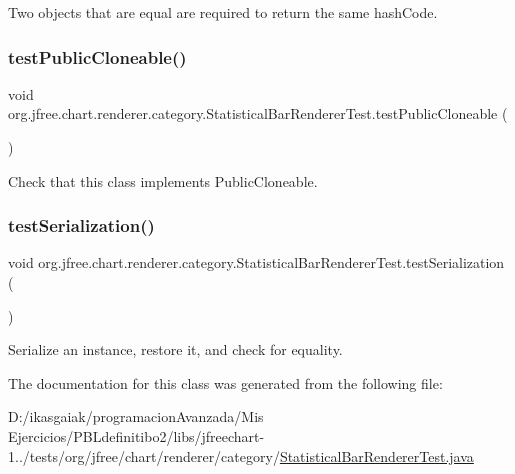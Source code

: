 Two objects that are equal are required to return the same hash\+Code. \mbox{\label{classorg_1_1jfree_1_1chart_1_1renderer_1_1category_1_1_statistical_bar_renderer_test_aa25476595a71144ad7cafc4b03542846}} 
\subsubsection{\texorpdfstring{test\+Public\+Cloneable()}{testPublicCloneable()}}
{\footnotesize\ttfamily void org.\+jfree.\+chart.\+renderer.\+category.\+Statistical\+Bar\+Renderer\+Test.\+test\+Public\+Cloneable (\begin{DoxyParamCaption}{ }\end{DoxyParamCaption})}

Check that this class implements Public\+Cloneable. \mbox{\label{classorg_1_1jfree_1_1chart_1_1renderer_1_1category_1_1_statistical_bar_renderer_test_adf1693923c89fd159e8a92057e6417f8}} 
\subsubsection{\texorpdfstring{test\+Serialization()}{testSerialization()}}
{\footnotesize\ttfamily void org.\+jfree.\+chart.\+renderer.\+category.\+Statistical\+Bar\+Renderer\+Test.\+test\+Serialization (\begin{DoxyParamCaption}{ }\end{DoxyParamCaption})}

Serialize an instance, restore it, and check for equality. 

The documentation for this class was generated from the following file\+:\begin{DoxyCompactItemize}
\item 
D\+:/ikasgaiak/programacion\+Avanzada/\+Mis Ejercicios/\+P\+B\+Ldefinitibo2/libs/jfreechart-\/1../tests/org/jfree/chart/renderer/category/\mbox{\hyperlink{_statistical_bar_renderer_test_8java}{Statistical\+Bar\+Renderer\+Test.\+java}}\end{DoxyCompactItemize}
